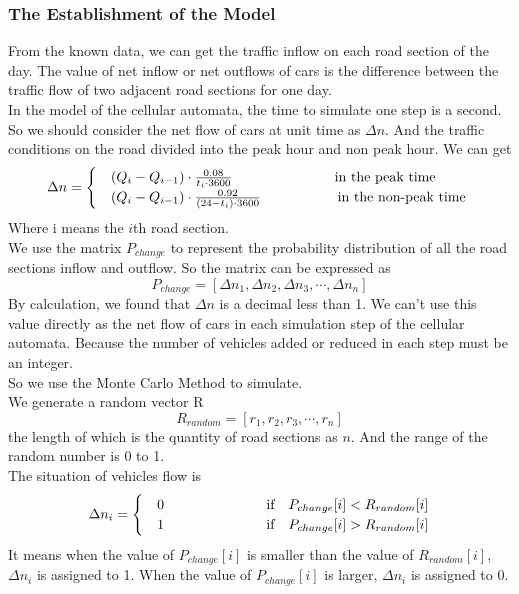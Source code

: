 \documentclass{mcmthesis}
\begin{document}
\subsubsection{The Establishment of the Model}
\indent From the known data, we can get the traffic inflow on each road section of the day. The value of net inflow or net outflows of cars is the difference between the traffic flow of two adjacent road sections for one day.\\
\indent In the model of the cellular automata, the time to simulate one step is a second. So we should consider the net flow of cars at unit time as $\Delta n$. And the traffic conditions on the road divided into the peak hour and non peak hour. We can get
\begin{equation}
	\Delta n=\begin{cases}
	&(Q_{i}-Q_{i-1})\cdot \frac{0.08}{t_{i}\cdot 3600} \indent\indent\indent \indent\quad\text{\,\,in the peak time }\\ 
	&(Q_{i}-Q_{i-1})\cdot \frac{0.92}{(24-t_{i})\cdot 3600}\indent\indent\indent \quad\text{in the non-peak time } 
	\end{cases}
\end{equation}
\indent Where i means the $i$th road section. \\
\indent We use the matrix $P_{change}$ to represent the probability distribution of all the road sections inflow and outflow. So the matrix can be expressed as
\begin{equation}
	P_{change}=[\Delta n_1, \Delta n_2,\Delta n_3,\cdots, \Delta n_n]
\end{equation}
\indent By calculation, we found that $\Delta n$ is a decimal less than 1. We can't use this value directly as the net flow of cars in each simulation step of the cellular automata. Because the number of vehicles added or reduced in each step must be an integer.\\
\indent So we use the Monte Carlo Method to simulate.\\
\indent We generate a random vector R\\
\begin{equation}
	R_{random}=[r_1, r_2,r_3,\cdots, r_n]
\end{equation}
\indent the length of which is the quantity of road sections as $n$. And the range of the random number is 0 to 1.\\
\indent The situation of vehicles flow is 
\begin{equation}
	\Delta n_{i}=\begin{cases}
	&0 \indent\indent\indent \indent\quad\text{\,\,if \,\, $P_{change}[i] < R_{random}[i]$}\\ 
	&1 \indent\indent\indent\indent \quad\text{\,\,if \,\, $P_{change}[i] > R_{random}[i]$} 
	\end{cases}
\end{equation}
\indent It means when the value of $P_{change}[i]$ is smaller than the value of $R_{random}[i]$, $\Delta n_{i}$ is assigned to 1. When the value of $P_{change}[i]$ is larger,  $\Delta n_{i}$ is assigned to 0.
\end{document}
